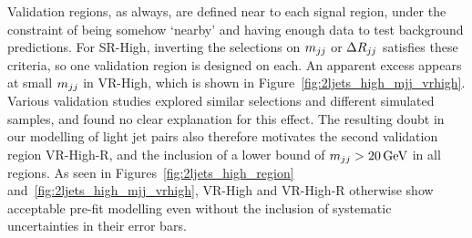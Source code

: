 Validation regions, as always, are defined near to each signal region, under
the constraint of being somehow `nearby' and having enough data to test
background predictions.
For SR-High, inverting the selections on $\mjj$ or $\rjj$ satisfies
these criteria, so one validation region is designed on each.
An apparent excess appears at small $\mjj$ in VR-High, which is shown in
Figure~\ref{fig:2ljets_high_mjj_vrhigh}.
Various validation studies explored similar selections and different
simulated samples, and found no clear explanation for this effect.
The resulting doubt in our modelling of light jet pairs also therefore motivates
the second validation region VR-High-R, and the inclusion of a lower bound of
$\mjj > 20\,\eV[G]$ in all regions.
As seen in Figures~\ref{fig:2ljets_high_region}
and~\ref{fig:2ljets_high_mjj_vrhigh}, VR-High and VR-High-R otherwise show
acceptable pre-fit modelling even without the inclusion of systematic
uncertainties in their error bars.

